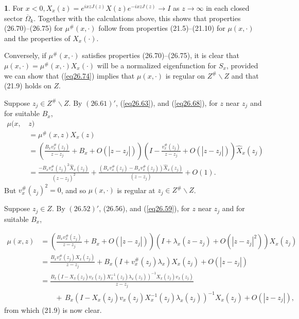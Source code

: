 \documentclass{surv-l}
\theoremstyle{plain}
\theoremstyle{definition}
\newtheorem*{pf}{\sc{Proof}}
\numberwithin{equation}{chapter}
\begin{document}
\begin{pf}
For $x<0,X_{x}(z)=e^{ixz J(z)}X(z)e^{-ixzJ(z)}\rightarrow I$ as $ z\rightarrow\infty$ in each closed sector $\overline{\Omega}_{k}$. Together with the calculations above, this shows that properties (26.70)--(26.75) for $\mu^{\#}(x, \cdot)$ follow from properties (21.5)--(21.10) for $\mu(x, \cdot)$ and the properties of $X_{x}(\cdot)$.

Conversely, if $\mu^{\#}(x, \cdot)$ satisfies properties (26.70)--(26.75), it is clear that $\mu(x, \cdot)=\mu^{\#}(x, \cdot)X_{x}(\cdot)$ will be a normalized eigenfunction for $S_{x}$, provided we can show that (\ref{eq26.74}) implies that $\mu(x, \cdot)$ is regular on $Z^{\#}\backslash Z$ and that (21.9) holds on $Z$.

Suppose $z_{j}\in Z^{\#}\backslash Z$. By $(26.61 )'$, (\ref{eq26.63}), and (\ref{eq26.68}), for $z$ near $z_{j}$ and for suitable $B_{x}$,
\begin{align*}
\mu(x,\,&z)\\
&=\mu^{\#}(x,z)X_{x}(z)\\
&=\left(\displaystyle \frac{B_{x}v_{x}^{\#}(z_{j})}{z-z_{j}}+B_{x}+O(|z-z_{j}|)\right)\left(I-\frac{v_{x}^{\#}(z_{j})}{z-z_{j}}+O(|z-z_{j}|)\right)\hat{X}_{x}(z_{j})\\
&=\displaystyle \frac{-B_{x}v_{x}^{\#}(z_{j})^{2}\hat{X}_{x}(z_{j})}{(z-z_{j})^{2}}+\frac{(B_{x}v_{x}^{\#}(z_{j})-B_{x}v_{x}^{\#}(z_{j}))\hat{X}_{x}(z_{j})}{(z-z_{j})}+O(1).
\end{align*}
But $v_{x}^{\#}(z_{j})^{2}=0$, and so $\mu(x, \cdot)$ is regular at $z_{j}\in Z^{\#}\backslash Z$.

Suppose $z_{j}\in Z$. By $(26.52)'$, (26.56), and (\ref{eq26.59}), for $z$ near $z_{j}$ and for suitable $B_{x}$,


\begin{align*}
\displaystyle \mu(x,z)&=\left(\frac{B_{x}v_{x}^{\#}(z_{j})}{z-z_{j}}+B_{x}+O(|z-z_{j}|)\right)(I+\lambda_{x}(z-z_{j})+O(|z-z_{j}|^{2}))X_{x}(z_{j})\\
&=\frac{B_{x}v_{x}^{\#}(z_{j})X_{x}(z_{j})}{z-z_{j}}+B_{x}(I+v_{x}^{\#}(z_{j})\lambda_{x})X_{x}(z_{j})+O(|z-z_{j}|)\\
&=\frac{B_{x}(I-X_{x}(z_{j})v_{x}(z_{j})X_{x}^{-1}(z_{j})\lambda_{x}(z_{j}))^{-1}X_{x}(z_{j})v_{x}(z_{j})}{z-z_{j}}\\
&\qquad+\,B_{x}(I-X_{x}(z_{j})v_{x}(z_{j})X_{x}^{-1}(z_{j})\lambda_{x}(z_{j}))^{-1}X_{x}(z_{j})+O(|z-z_{j}|),
\end{align*}
from which (21.9) is now clear.
\end{pf}
\end{document}
